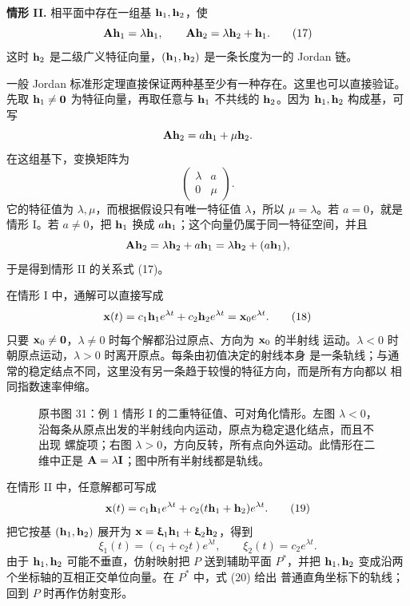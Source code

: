 \medskip
\noindent\textbf{情形 II.}
相平面中存在一组基 \(\vect{h}_1,\vect{h}_2\)，使
\begin{equation}
 \mat{A}\vect{h}_1=\lambda \vect{h}_1,\qquad
 \mat{A}\vect{h}_2=\lambda \vect{h}_2+\vect{h}_1.
 \tag{17}
\end{equation}
这时 \(\vect{h}_2\) 是二级广义特征向量，\((\vect{h}_1,\vect{h}_2)\) 是一条长度为一的 Jordan 链。

一般 Jordan 标准形定理直接保证两种基至少有一种存在。这里也可以直接验证。先取
\(\vect{h}_1\neq\vect{0}\) 为特征向量，再取任意与 \(\vect{h}_1\) 不共线的 \(\vect{h}_2\)。因为
\(\vect{h}_1,\vect{h}_2\) 构成基，可写
\[
 \mat{A}\vect{h}_2=a \vect{h}_1+\mu \vect{h}_2.
\]
在这组基下，变换矩阵为
\[
 \begin{pmatrix}
  \lambda&a\\
  0&\mu
 \end{pmatrix}.
\]
它的特征值为 \(\lambda,\mu\)，而根据假设只有唯一特征值 \(\lambda\)，所以
\(\mu=\lambda\)。若 \(a=0\)，就是情形 I。若 \(a\neq0\)，把 \(\vect{h}_1\) 换成
\(a \vect{h}_1\)；这个向量仍属于同一特征空间，并且
\[
 \mat{A} \vect{h}_2=\lambda \vect{h}_2+a \vect{h}_1
 =\lambda \vect{h}_2+(a \vect{h}_1),
\]
于是得到情形 II 的关系式 (17)。

在情形 I 中，通解可以直接写成
\begin{equation}
 \vect{x}(t)=c_1\vect{h}_1e^{\lambda t}+c_2\vect{h}_2e^{\lambda t}
 =\vect{x}_0e^{\lambda t}.
 \tag{18}
\end{equation}
只要 \(\vect{x}_0\neq\vect{0}\)，\(\lambda\neq0\) 时每个解都沿过原点、方向为 \(\vect{x}_0\) 的半射线
运动。\(\lambda<0\) 时朝原点运动，\(\lambda>0\) 时离开原点。每条由初值决定的射线本身
是一条轨线；与通常的稳定结点不同，这里没有另一条趋于较慢的特征方向，而是所有方向都以
相同指数速率伸缩。

\begin{figure}[H]
 \centering
 
 \caption{原书图 31：例 1 情形 I 的二重特征值、可对角化情形。左图
 \(\lambda<0\)，沿每条从原点出发的半射线向内运动，原点为稳定退化结点，而且不出现
 螺旋项；右图 \(\lambda>0\)，方向反转，所有点向外运动。此情形在二维中正是
 \(\mathbf{A}=\lambda \mathbf{I}\)；图中所有半射线都是轨线。}
 \label{fig:ch2-p2-31}
\end{figure}

在情形 II 中，任意解都可写成
\begin{equation}
 \vect{x}(t)=c_1\vect{h}_1e^{\lambda t}
      +c_2(t\vect{h}_1+\vect{h}_2)e^{\lambda t}.
 \tag{19}
\end{equation}
把它按基 \((\vect{h}_1,\vect{h}_2)\) 展开为
\(\vect{x}=\xi_1\vect{h}_1+\xi_2\vect{h}_2\)，得到
\begin{equation}
 \xi_1(t)=(c_1+c_2t)e^{\lambda t},\qquad
 \xi_2(t)=c_2e^{\lambda t}.
 \tag{20}
\end{equation}
由于 \(\vect{h}_1,\vect{h}_2\) 可能不垂直，仿射映射把 \(P\) 送到辅助平面 \(P^*\)，并把 \(\vect{h}_1,\vect{h}_2\)
变成沿两个坐标轴的互相正交单位向量。在 \(P^*\) 中，式 (20) 给出
普通直角坐标下的轨线；回到 \(P\) 时再作仿射变形。


